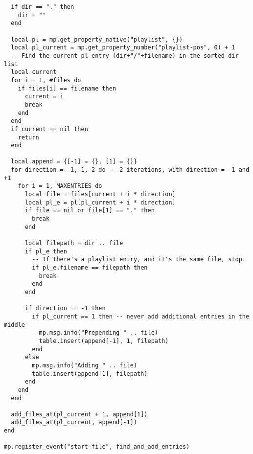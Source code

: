 \documentclass[11pt]{article}
\begin{document}
\begin{lstlisting}
  if dir == "." then
    dir = ""
  end

  local pl = mp.get_property_native("playlist", {})
  local pl_current = mp.get_property_number("playlist-pos", 0) + 1
  -- Find the current pl entry (dir+"/"+filename) in the sorted dir list
  local current
  for i = 1, #files do
    if files[i] == filename then
      current = i
      break
    end
  end
  if current == nil then
    return
  end

  local append = {[-1] = {}, [1] = {}}
  for direction = -1, 1, 2 do -- 2 iterations, with direction = -1 and +1
    for i = 1, MAXENTRIES do
      local file = files[current + i * direction]
      local pl_e = pl[pl_current + i * direction]
      if file == nil or file[1] == "." then
        break
      end

      local filepath = dir .. file
      if pl_e then
        -- If there's a playlist entry, and it's the same file, stop.
        if pl_e.filename == filepath then
          break
        end
      end

      if direction == -1 then
        if pl_current == 1 then -- never add additional entries in the middle
          mp.msg.info("Prepending " .. file)
          table.insert(append[-1], 1, filepath)
        end
      else
        mp.msg.info("Adding " .. file)
        table.insert(append[1], filepath)
      end
    end
  end

  add_files_at(pl_current + 1, append[1])
  add_files_at(pl_current, append[-1])
end

mp.register_event("start-file", find_and_add_entries)
\end{lstlisting}
\end{document}
